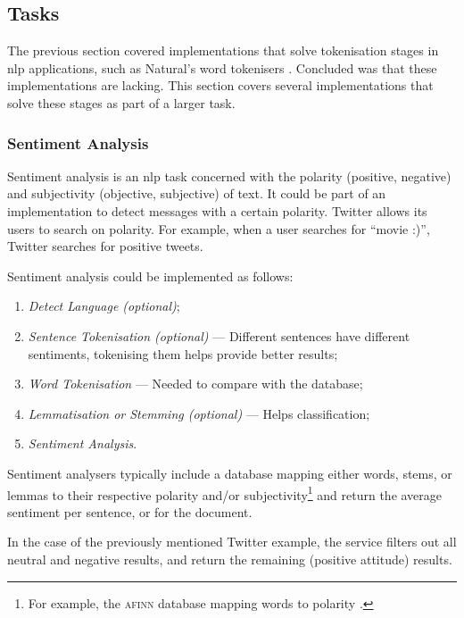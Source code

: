 \subsection{Tasks}\label{tasks}

The previous section covered implementations that solve tokenisation stages
  in \gls{nlp} applications, such as Natural's word
  tokenisers \autocite{NaturalNode/natural-source-code}.
Concluded was that these implementations are lacking.
This section covers several implementations that solve these stages
  as part of a larger task.

\subsubsection{Sentiment Analysis}\label{sentiment-analysis}

Sentiment analysis is an \gls{nlp} task concerned with the polarity
  (positive, negative) and subjectivity (objective, subjective) of text.
It could be part of an implementation to detect messages with a certain
  polarity.
Twitter allows its users to search on polarity.
For example, when a user searches for ``movie :)'', Twitter searches for
  positive tweets.

Sentiment analysis could be implemented as follows:

\begin{enumerate}
\item\emph{Detect Language (optional)};
\item\emph{Sentence Tokenisation (optional)} --- Different sentences have
    different sentiments, tokenising them helps provide better results;
\item\emph{Word Tokenisation} --- Needed to compare with the database;
\item\emph{Lemmatisation or Stemming (optional)} --- Helps classification;
\item\emph{Sentiment Analysis}.
\end{enumerate}

\noindent Sentiment analysers typically include a
  database mapping either words, stems, or lemmas to their respective
  polarity and\slash or subjectivity\footnote{For example, the \textsc{afinn}
    database mapping words to polarity \autocite{nielsen-finn-arup-afinn}.}
  and return the average sentiment per sentence, or for the document.

In the case of the previously mentioned Twitter example, the service filters
  out all neutral and negative results, and return the remaining (positive
  attitude) results.

